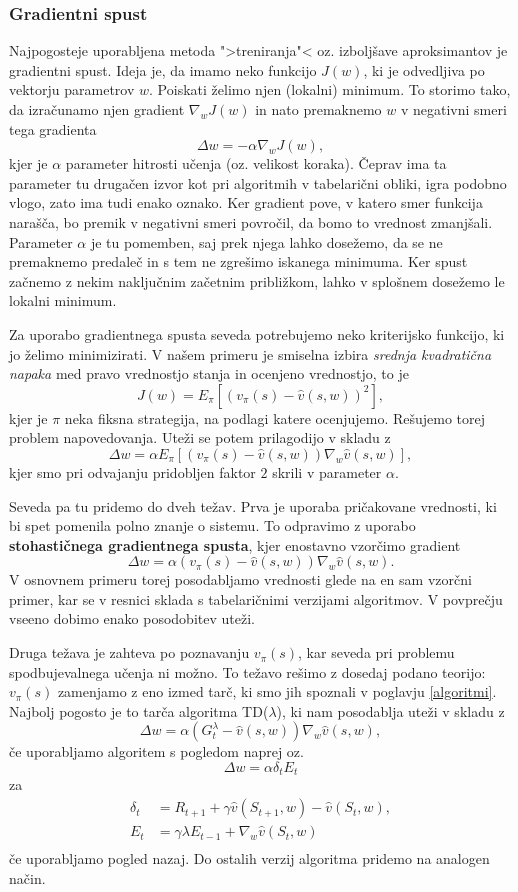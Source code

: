 \documentclass[12pt,a4paper]{amsart}
\theoremstyle{definition} %
\theoremstyle{plain} %
\begin{document}
\subsubsection{Gradientni spust}
Najpogosteje uporabljena metoda ">treniranja"<  oz. izboljšave aproksimantov je gradientni spust. 
Ideja je, da imamo neko funkcijo $J(w)$, ki je odvedljiva po vektorju parametrov $w$. Poiskati želimo njen 
(lokalni) minimum. To storimo tako, da izračunamo njen gradient $\nabla_wJ(w)$ in nato premaknemo $w$
v negativni smeri tega gradienta
$$
\Delta w = - \alpha \nabla_wJ(w),
$$
kjer je $\alpha$ parameter hitrosti učenja (oz. velikost koraka). Čeprav ima ta parameter tu drugačen izvor 
kot pri algoritmih v tabelarični obliki, igra podobno vlogo, zato ima tudi enako oznako. Ker gradient pove, v katero smer 
funkcija narašča, bo premik v negativni smeri povročil, da bomo to vrednost zmanjšali. Parameter 
$\alpha$ je tu pomemben, saj prek njega lahko dosežemo, da se ne premaknemo predaleč in s tem ne zgrešimo
iskanega minimuma. Ker spust začnemo z nekim naključnim začetnim približkom, lahko v splošnem 
dosežemo le lokalni minimum.

Za uporabo gradientnega spusta seveda potrebujemo neko kriterijsko funkcijo, ki jo želimo minimizirati. 
V našem primeru je smiselna izbira \textit{srednja kvadratična napaka} med pravo vrednostjo stanja in 
ocenjeno vrednostjo, to je 
$$
J(w) = E_\pi [(v_\pi(s) - \hat{v}(s, w))^2],
$$
kjer je $\pi$ neka fiksna strategija, na podlagi katere ocenjujemo. Rešujemo torej problem napovedovanja.
Uteži se potem prilagodijo v skladu z 
$$
\Delta w = \alpha E_\pi [(v_\pi(s) - \hat{v}(s, w)) \nabla_w \hat{v}(s, w)], 
$$
kjer smo pri odvajanju pridobljen faktor $2$ skrili v parameter $\alpha$.

Seveda pa tu pridemo do dveh težav. Prva je uporaba pričakovane vrednosti, ki bi spet pomenila polno 
znanje o sistemu. To odpravimo z uporabo \textbf{stohastičnega gradientnega spusta}, kjer 
enostavno vzorčimo gradient 
$$
\Delta w = \alpha (v_\pi(s) - \hat{v}(s, w)) \nabla_w \hat{v}(s, w). 
$$
V osnovnem primeru torej posodabljamo vrednosti glede na en sam vzorčni primer, kar se v resnici sklada 
s tabelaričnimi verzijami algoritmov.
V povprečju vseeno dobimo enako posodobitev uteži. 

Druga težava je zahteva po poznavanju $v_\pi(s)$, kar seveda pri problemu spodbujevalnega učenja ni 
možno. To težavo rešimo z dosedaj podano teorijo: $v_\pi(s)$ zamenjamo z eno izmed tarč, ki smo jih 
spoznali v poglavju \ref{algoritmi}. Najbolj pogosto je to tarča algoritma TD($\lambda$), ki nam 
posodablja uteži v skladu z 
$$
\Delta w = \alpha (G_t^\lambda - \hat{v}(s, w)) \nabla_w \hat{v}(s, w), 
$$
če uporabljamo algoritem s pogledom naprej oz. 
$$
\Delta w = \alpha \delta_t E_t
$$
za
\begin{align*}
    \delta_t &= R_{t+1} + \gamma \hat{v}(S_{t+1}, w) - \hat{v}(S_t, w), \\
    E_t &= \gamma \lambda E_{t-1} + \nabla_w \hat{v}(S_t, w) \\
\end{align*}
če uporabljamo pogled nazaj. Do ostalih verzij algoritma pridemo na analogen način.
\end{document}

